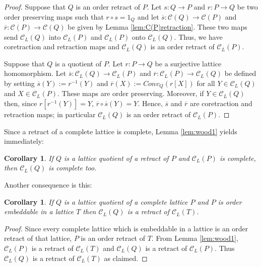 \documentclass[12pt]{amsart}
\newtheorem{corollary}[definition]{{\bf Corollary}}
\begin{document}
\begin{proof}
Suppose that $Q$ is an order retract of $P$. Let $s: Q \rightarrow P$
and $r:P\rightarrow Q$ be two order preserving maps such that $r\circ
s =1_{Q}$ and let $\overline s: \mathcal C (Q) \rightarrow \mathcal C
(P)$ and $\overline r:\mathcal C (P)\rightarrow \mathcal C (Q)$ be
given by Lemma \ref {lem:C(P)retraction}.  These two maps send
$\mathcal C_L (Q)$ into $\mathcal C_L (P)$ and $\mathcal C_L (P)$ onto
$\mathcal C_L (Q)$.  Thus, we have coretraction and retraction maps
and $\mathcal{C}_{ L}(Q)$ is an order retract of $\mathcal{C}_{
L}(P)$.

Suppose that $Q$ is a quotient of $P$. Let $r: P\rightarrow Q$ be a
surjective lattice homomorphism.  Let $\overline s:
\mathcal{C}_L(Q)\rightarrow \mathcal{C}_{ L}(P)$ and $\overline r:
\mathcal{C}_{ L}( P)\rightarrow \mathcal{C}_{ L}(Q)$ be defined by
setting $\overline s(Y):=r^{-1}(Y)$ and $\overline r(X):=Conv_Q(r[X])$
for all $Y\in \mathcal{C}_{ L}(Q)$ and $X\in \mathcal C_L (P)$. These
maps are order preserving.  Moreover, if $Y\in \mathcal{C}_{ L}(Q)$
then, since $r[r^{-1}(Y)]=Y$, $\overline r\circ \overline s(Y)=Y$.
Hence, $\overline s$ and $\overline r$ are coretraction and retraction
maps; in particular $\mathcal{C}_{ L}(Q)$ is an order retract of
$\mathcal{C}_{ L}(P)$.
\end{proof}

Since a retract of a complete lattice is complete, Lemma
\ref{lem:wood1} yields immediately:
 
\begin{corollary}\label{cor:CL_{*}(T)retract+quotient} 
If $Q$ is a lattice quotient of a retract of $P$ and $\mathcal{C}_{
L}(P)$ is complete, then $\mathcal{C}_{ L}(Q)$ is complete too.
\end{corollary}

Another consequence is this:

\begin{corollary} \label{cor:wood1} 
If $Q$ is a lattice quotient of a complete lattice $P$ and $P$ is
order embeddable in a lattice $T$ then $\mathcal{C}_{ L}(Q)$ is a
retract of $\mathcal{C}_{ L}(T)$.
\end{corollary}

\begin{proof}  
Since every complete lattice which is embeddable in a lattice is an
order retract of that lattice, $P$ is an order retract of $T$. From
Lemma \ref{lem:wood1}, $\mathcal{C}_{ L}(P)$ is a retract of
$\mathcal{C}_{ L}(T)$ and $\mathcal{C}_{ L}(Q)$ is a retract of
$\mathcal{C}_{ L}(P)$.  Thus $\mathcal{C}_{ L}(Q)$ is a retract of
$\mathcal{C}_{ L}(T)$ as claimed. \end{proof}\\
\end{document}
